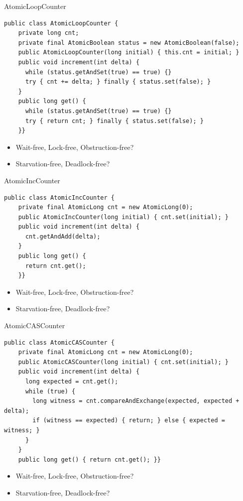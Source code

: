 \begin{frame}[t,fragile]{AtomicLoopCounter}

\begin{verbatim}
public class AtomicLoopCounter {
    private long cnt;
    private final AtomicBoolean status = new AtomicBoolean(false); 
    public AtomicLoopCounter(long initial) { this.cnt = initial; }
    public void increment(int delta) { 
      while (status.getAndSet(true) == true) {}
      try { cnt += delta; } finally { status.set(false); }
    }
    public long get() { 
      while (status.getAndSet(true) == true) {}
      try { return cnt; } finally { status.set(false); }
    }}
\end{verbatim}

\begin{itemize}  
  \item Wait-free, Lock-free, Obstruction-free?
  \item Starvation-free, Deadlock-free?
\end{itemize}

\end{frame}

\begin{frame}[t,fragile]{AtomicIncCounter}

\begin{verbatim}
public class AtomicIncCounter {
    private final AtomicLong cnt = new AtomicLong(0); 
    public AtomicIncCounter(long initial) { cnt.set(initial); }
    public void increment(int delta) { 
      cnt.getAndAdd(delta);
    }
    public long get() { 
      return cnt.get();
    }}
\end{verbatim}

\begin{itemize}  
  \item Wait-free, Lock-free, Obstruction-free?
  \item Starvation-free, Deadlock-free?
\end{itemize}

\end{frame}


\begin{frame}[t,fragile]{AtomicCASCounter}

\begin{verbatim}
public class AtomicCASCounter {
    private final AtomicLong cnt = new AtomicLong(0); 
    public AtomicCASCounter(long initial) { cnt.set(initial); }
    public void increment(int delta) {
      long expected = cnt.get();
      while (true) {        
        long witness = cnt.compareAndExchange(expected, expected + delta);
        if (witness == expected) { return; } else { expected = witness; }        
      }
    }
    public long get() { return cnt.get(); }}
\end{verbatim}

\begin{itemize}  
  \item Wait-free, Lock-free, Obstruction-free?
  \item Starvation-free, Deadlock-free?
\end{itemize}

\end{frame}


